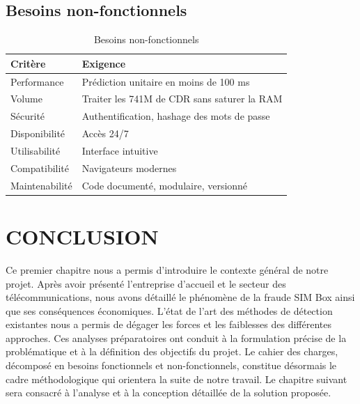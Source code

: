 \documentclass[12pt, oneside, a4paper]{report}
\begin{document}
\subsection{Besoins non-fonctionnels}
\begin{table}[H]
\centering
\caption{Besoins non-fonctionnels}
\label{tab:bnf}
\vspace{0.5cm}
\renewcommand{\arraystretch}{1.3}
\begin{tabular}{|l|p{10cm}|}
\hline
\textbf{Critère} & \textbf{Exigence} \\
\hline
Performance & Prédiction unitaire en moins de 100 ms \\
\hline
Volume & Traiter les 741M de CDR sans saturer la RAM \\
\hline
Sécurité & Authentification, hashage des mots de passe \\
\hline
Disponibilité & Accès 24/7 \\
\hline
Utilisabilité & Interface intuitive \\
\hline
Compatibilité & Navigateurs modernes \\
\hline
Maintenabilité & Code documenté, modulaire, versionné \\
\hline
\end{tabular}
\end{table}

\section{CONCLUSION}
Ce premier chapitre nous a permis d'introduire le contexte général de notre projet. Après avoir présenté l'entreprise d'accueil et le secteur des télécommunications, nous avons détaillé le phénomène de la fraude SIM Box ainsi que ses conséquences économiques. L'état de l'art des méthodes de détection existantes nous a permis de dégager les forces et les faiblesses des différentes approches. Ces analyses préparatoires ont conduit à la formulation précise de la problématique et à la définition des objectifs du projet. Le cahier des charges, décomposé en besoins fonctionnels et non-fonctionnels, constitue désormais le cadre méthodologique qui orientera la suite de notre travail. Le chapitre suivant sera consacré à l'analyse et à la conception détaillée de la solution proposée.


\clearpage
\thispagestyle{fancy} %
\setcounter{section}{0}
\end{document}

